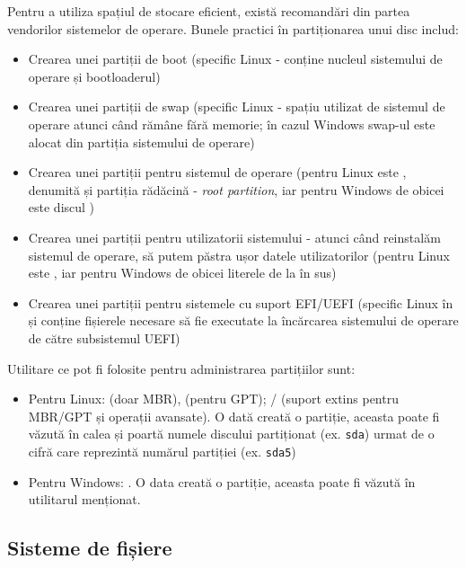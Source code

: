 Pentru a utiliza spațiul de stocare eficient, există recomandări din partea
vendorilor sistemelor de operare. Bunele practici în partiționarea unui disc
includ:

\begin{itemize}
  \item Crearea unei partiții de boot (specific Linux  - conține
    nucleul sistemului de operare și bootloaderul)
  \item Crearea unei partiții de swap (specific Linux - spațiu utilizat de
    sistemul de operare atunci când rămâne fără memorie; în cazul
    Windows swap-ul este alocat din partiția sistemului de operare)
  \item Crearea unei partiții pentru sistemul de operare (pentru Linux
          este \file{/}, denumită și partiția rădăcină - \textit{root partition}, iar pentru Windows de obicei este
                discul )
  \item Crearea unei partiții pentru utilizatorii sistemului - atunci când
    reinstalăm sistemul de operare, să putem păstra ușor datele
                utilizatorilor (pentru Linux este , iar pentru Windows de
                obicei literele de la  în sus)
  \item Crearea unei partiții pentru sistemele cu suport EFI/UEFI
          (specific Linux în  și conține fișierele necesare să
    fie executate la încărcarea sistemului de operare de către
    subsistemul UEFI)
\end{itemize}

Utilitare ce pot fi folosite pentru administrarea partițiilor sunt:

\begin{itemize}
  \item Pentru Linux:  (doar MBR),  (pentru GPT); / (suport extins
    pentru MBR/GPT și operații avansate). O dată creată o partiție,
                aceasta poate fi văzută în calea  și poartă numele discului
                partiționat (ex. \texttt{sda}) urmat de o cifră care reprezintă numărul
                partiției (ex. \texttt{sda5})
  \item Pentru Windows: . O data creată o partiție, aceasta
    poate fi văzută în utilitarul menționat.
\end{itemize}

\subsection{Sisteme de fișiere}
\label{sec:storage:fs}

